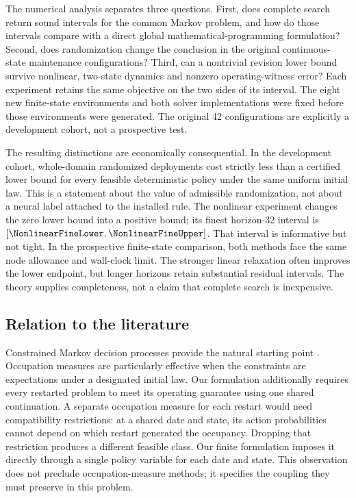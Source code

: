 The numerical analysis separates three questions. First, does complete search return sound intervals for the common Markov problem, and how do those intervals compare with a direct global mathematical-programming formulation? Second, does randomization change the conclusion in the original continuous-state maintenance configurations? Third, can a nontrivial revision lower bound survive nonlinear, two-state dynamics and nonzero operating-witness error? Each experiment retains the same objective on the two sides of its interval. The eight new finite-state environments and both solver implementations were fixed before those environments were generated. The original 42 configurations are explicitly a development cohort, not a prospective test.

The resulting distinctions are economically consequential. In the development cohort, \PrimaryStrict{} whole-domain randomized deployments cost strictly less than a certified lower bound for every feasible deterministic policy under the same uniform initial law. This is a statement about the value of admissible randomization, not about a neural label attached to the installed rule. The nonlinear experiment changes the zero lower bound into a positive bound; its finest horizon-32 interval is $[\NonlinearFineLower,\NonlinearFineUpper]$. That interval is informative but not tight. In the prospective finite-state comparison, both methods face the same node allowance and wall-clock limit. The stronger linear relaxation often improves the lower endpoint, but longer horizons retain substantial residual intervals. The theory supplies completeness, not a claim that complete search is inexpensive.

\subsection{Relation to the literature}\label{sec:literature}
Constrained Markov decision processes provide the natural starting point \citep{Altman1999}. Occupation measures are particularly effective when the constraints are expectations under a designated initial law. Our formulation additionally requires every restarted problem to meet its operating guarantee using one shared continuation. A separate occupation measure for each restart would need compatibility restrictions: at a shared date and state, its action probabilities cannot depend on which restart generated the occupancy. Dropping that restriction produces a different feasible class. Our finite formulation imposes it directly through a single policy variable for each date and state. This observation does not preclude occupation-measure methods; it specifies the coupling they must preserve in this problem.

